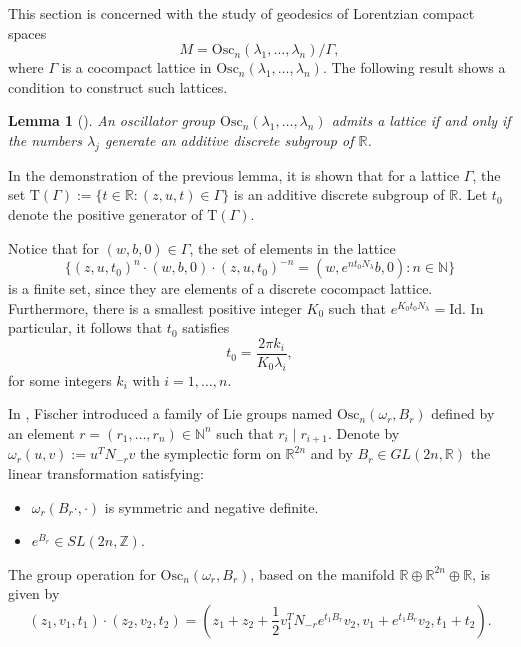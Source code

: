 \documentclass[12pt]{amsart}
\theoremstyle{plain}
\newtheorem{lem}[thm]{Lemma}
\theoremstyle{definition}
\theoremstyle{remark}
\begin{document}
This section is concerned with the study of geodesics of Lorentzian compact spaces 
\[
M = \text{Osc}_n(\lambda_1, \ldots, \lambda_n) / \Gamma,
\]
where \( \Gamma \) is a cocompact lattice in \( \text{Osc}_n(\lambda_1, \ldots, \lambda_n) \). The following result shows a condition to construct such lattices.

\begin{lem}[\cite{MeRe}]\label{lema_medina}
    An oscillator group \( \text{Osc}_n(\lambda_1, \ldots, \lambda_n) \) admits a lattice if and only if the numbers \( \lambda_j \) generate an additive discrete subgroup of \( \mathbb{R} \).
\end{lem}

In the demonstration of the previous lemma, it is shown that for a lattice \( \Gamma \), the set \( \mathrm{T}(\Gamma) := \{ t \in \mathbb{R} : (z,u,t) \in \Gamma \} \) is an additive discrete subgroup of \( \mathbb{R} \). Let \( t_0 \) denote the positive generator of \( \mathrm{T}(\Gamma) \).

Notice that for \( (w,b,0) \in \Gamma \), the set of elements in the lattice
\[
\{ (z,u,t_0)^n \cdot (w,b,0) \cdot (z,u,t_0)^{-n} = (w,e^{n t_0 N_{\lambda}}b,0) : n \in \mathbb{N} \}
\]
is a finite set, since they are elements of a discrete cocompact lattice. Furthermore, there is a smallest positive integer \( K_0 \) such that \( e^{K_0 t_0 N_{\lambda}} = \text{Id} \). In particular, it follows that \( t_0 \) satisfies
\begin{equation}\label{oscilator-N}
    t_0 = \frac{2 \pi k_i}{K_0 \lambda_i},
\end{equation}
for some integers \( k_i \) with \( i = 1, \ldots, n \).

In \cite{MF}, Fischer introduced a family of Lie groups named \( \text{Osc}_n(\omega_r, B_r) \) defined by an element \( r = (r_1, \ldots, r_n) \in \mathbb{N}^n \) such that \( r_i \mid r_{i+1} \). Denote by \( \omega_r(u,v) := u^T N_{-r} v \) the symplectic form on \( \mathbb{R}^{2n} \) and by \( B_r \in GL(2n, \mathbb{R}) \) the linear transformation satisfying:

\begin{itemize}
    \item \( \omega_r(B_r \cdot, \cdot) \) is symmetric and negative definite.
    \item \( e^{B_r} \in SL(2n, \mathbb{Z}) \).
\end{itemize}

The group operation for \( \text{Osc}_n(\omega_r, B_r) \), based on the manifold \( \mathbb{R} \oplus \mathbb{R}^{2n} \oplus \mathbb{R} \), is given by
\begin{equation}
    (z_1, v_1, t_1) \cdot (z_2, v_2, t_2) = \left(z_1 + z_2 + \frac{1}{2} v_1^T N_{-r} e^{t_1 B_r} v_2, v_1 + e^{t_1 B_r} v_2, t_1 + t_2\right).
\end{equation}
\end{document}
